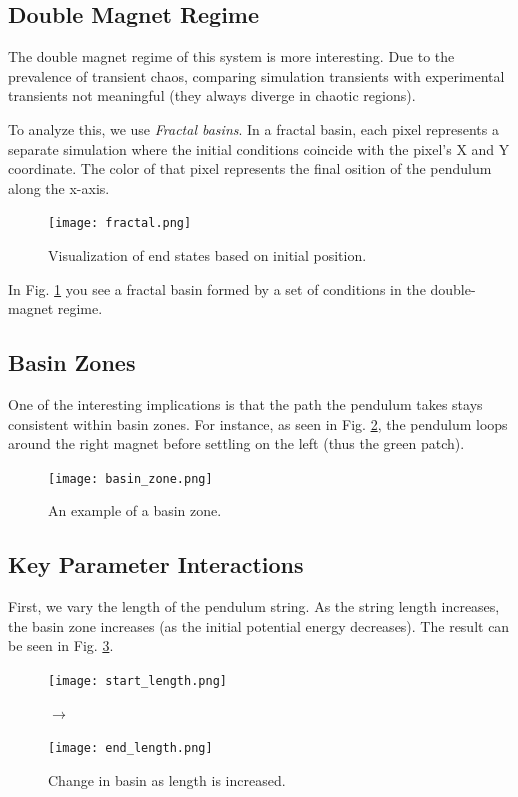 \documentclass[prl,twocolumn,amsmath,amssymb,superscriptaddress]{revtex4-2}
\begin{document}
\subsection{Double Magnet Regime}

The double magnet regime of this system is more interesting. Due to the prevalence of transient chaos, comparing simulation transients with experimental transients not meaningful (they always diverge in chaotic regions).

To analyze this, we use \textit{Fractal basins}. In a fractal basin, each pixel represents a separate simulation where the initial conditions coincide with the pixel's X and Y coordinate. The color of that pixel represents the final osition of the pendulum along the x-axis.

\begin{figure}[htb]
    \centering
    \texttt{[image: fractal.png]}
    \caption{Visualization of end states based on initial position.}
    \label{fig:fractal}
\end{figure}

In Fig. \ref{fig:fractal} you see a fractal basin formed by a set of conditions in the double-magnet regime.

\subsection{Basin Zones}
One of the interesting implications is that the path the pendulum takes stays consistent within basin zones. For instance, as seen in Fig. \ref{fig:basin_zone}, the pendulum loops around the right magnet before settling on the left (thus the green patch).

\begin{figure}[htb]
    \centering
    \texttt{[image: basin\_zone.png]}
    \caption{An example of a basin zone.}
    \label{fig:basin_zone}
    \vspace{-20pt}
\end{figure}

\subsection{Key Parameter Interactions}
First, we vary the length of the pendulum string. As the string length increases, the basin zone increases (as the initial potential energy decreases). The result can be seen in Fig. \ref{fig:length_interaction}.

\begin{figure}[htb]
    \begin{minipage}{0.45\linewidth}
        \texttt{[image: start\_length.png]}
    \end{minipage}%
    \hspace{5pt}
    $\rightarrow$
    \begin{minipage}{0.45\linewidth}
        \texttt{[image: end\_length.png]}
    \end{minipage}
    \caption{Change in basin as length is increased.}
    \label{fig:length_interaction}
\end{figure}
\end{document}
